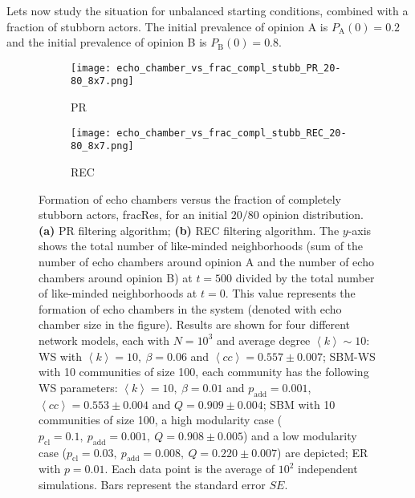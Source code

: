 \documentclass[11 pt , letterpaper , twoside , openright]{book}
\begin{document}
\newline
Lets now study the situation for unbalanced starting conditions, combined with a fraction of stubborn actors. The initial prevalence of opinion A is $P_\text{A}(0) = 0.2$ and the initial prevalence of opinion B is $P_\text{B}(0) = 0.8$.

\begin{figure}[H]
  \begin{subfigure}[b]{0.49\textwidth}
    \caption{PR}
  	\texttt{[image: echo\_chamber\_vs\_frac\_compl\_stubb\_PR\_20-80\_8x7.png]}
    \label{PR_frac_compl_stubb_20-80}
  \end{subfigure}
  \begin{subfigure}[b]{0.49\textwidth}
    \caption{REC}
  	\texttt{[image: echo\_chamber\_vs\_frac\_compl\_stubb\_REC\_20-80\_8x7.png]}
    \label{REC_frac_compl_stubb_20-80}
  \end{subfigure}
  \captionsetup{format=plain}
  \caption[Formation of echo chambers versus fraction of completely stubborn actors for the PR and REC filtering algorithms and an initial $20/80$ opinion distribution.]{Formation of echo chambers versus the fraction of completely stubborn actors, fracRes, for an initial $20/80$ opinion distribution. \textbf{(a)} PR filtering algorithm; \textbf{(b)} REC filtering algorithm. The $y$-axis shows the total number of like-minded neighborhoods (sum of the number of echo chambers around opinion A and the number of echo chambers around opinion B) at $t=500$ divided by the total number of like-minded neighborhoods at $t=0$. This value represents the formation of echo chambers in the system (denoted with echo chamber size in the figure). Results are shown for four different network models, each with $N=10^3$ and average degree $\left<k\right> \sim 10$: WS with $\left<k\right> =10,\ \beta = 0.06$ and $\left<cc\right> = 0.557 \pm 0.007$; SBM-WS with 10 communities of size 100, each community has the following WS parameters: $\left<k\right> = 10,\ \beta = 0.01$ and $p_{\text{add}} = 0.001$, $\left<cc\right> = 0.553 \pm 0.004$ and $Q = 0.909 \pm 0.004$; SBM with 10 communities of size 100, a high modularity case ($p_{\text{cl}} = 0.1,\ p_{\text{add}} = 0.001,\ Q = 0.908 \pm 0.005$) and a low modularity case ($p_{\text{cl}} = 0.03,\ p_{\text{add}} = 0.008,\ Q = 0.220 \pm 0.007$) are depicted; ER with $p= 0.01$. Each data point is the average of $10^2$ independent simulations. Bars represent the standard error $SE$.}
\label{echo_vs_frac_complStubb_PR-REC_20-80}
\end{figure}
\end{document}
